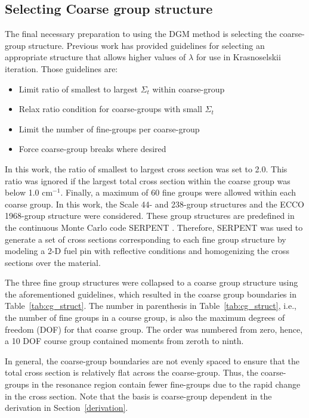 \documentclass[5p,times,twocolumn,10pt]{elsarticle}
\newcommand{\TAB}[1]{Table~\ref{#1}}              %
\newcommand{\SEC}[1]{Section~\ref{#1}}               %
\begin{document}
    \subsection{Selecting Coarse group structure}
    The final necessary preparation to using the DGM method is selecting the coarse-group structure.
    Previous work \cite{gibson_stability_2014} has provided guidelines for selecting an appropriate structure that allows higher values of $\lambda$ for use in Krasnoselskii iteration.
    Those guidelines are:
    \begin{itemize}
        \item Limit ratio of smallest to largest $\Sigma_t$ within coarse-group
        \item Relax ratio condition for coarse-groups with small $\Sigma_t$
        \item Limit the number of fine-groups per coarse-group
        \item Force coarse-group breaks where desired
    \end{itemize}
    In this work, the ratio of smallest to largest cross section was set to 2.0.
    This ratio was ignored if the largest total cross section within the coarse group was below 1.0 cm$^{-1}$.
    Finally, a maximum of 60 fine groups were allowed within each coarse group.
    In this work, the Scale 44- and 238-group structures and the ECCO 1968-group structure were considered.
    These group structures are predefined in the continuous Monte Carlo code SERPENT \cite{leppanen2015serpent}.
    Therefore, SERPENT was used to generate a set of cross sections corresponding to each fine group structure by modeling a 2-D fuel pin with reflective conditions and homogenizing the cross sections over the material.

    The three fine group structures were collapsed to a coarse group structure using the aforementioned guidelines, which resulted in the coarse group boundaries in \TAB{tab:cg_struct}.
    The number in parenthesis in \TAB{tab:cg_struct}, i.e., the number of fine groups in a course group, is also the maximum degrees of freedom (DOF) for that coarse group.
    The order was numbered from zero, hence, a 10 DOF course group contained moments from zeroth to ninth.

    In general, the coarse-group boundaries are not evenly spaced to ensure that the total cross section is relatively flat across the coarse-group.
    Thus, the coarse-groups in the resonance region contain fewer fine-groups due to the rapid change in the cross section.
    Note that the basis is coarse-group dependent in the derivation in \SEC{derivation}.
\end{document}
